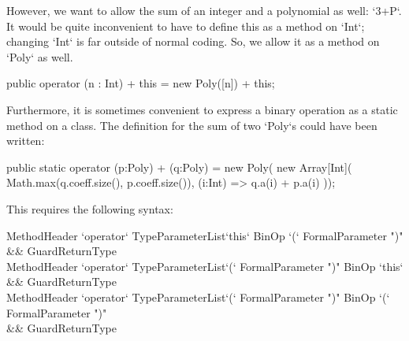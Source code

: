 However, we want to allow the sum of an integer and a polynomial as well:
\xcd`3+P`.  It would be quite inconvenient to have to define this as a method
on \xcd`Int`; changing \xcd`Int` is far outside of normal coding.  So, we
allow it as a method on \xcd`Poly` as well.


% 
\begin{xten}
   public operator (n : Int) + this = new Poly([n]) + this;
\end{xten}
% 
%     

Furthermore, it is sometimes convenient to express a binary operation as a
static method on a class. 
The definition for the sum of two
\xcd`Poly`s could have been written:
\begin{xten}
  public static operator (p:Poly) + (q:Poly) =  new Poly(
     new Array[Int](
        Math.max(q.coeff.size(), p.coeff.size()),
        (i:Int) => q.a(i) + p.a(i)
     ));
\end{xten}
%
% 
%     


This requires the following syntax:\\ 
\begin{grammar}
MethodHeader \:
  \xcd`operator` TypeParameterList\opt \xcd`this` BinOp \xcd`(`  FormalParameter \xcd")" \\
  && Guard\opt ReturnType\opt  \\
MethodHeader \:
  \xcd`operator` TypeParameterList\opt \xcd`(`  FormalParameter \xcd")" BinOp \xcd`this`  \\
  && Guard\opt ReturnType\opt   \\
MethodHeader \:
  \xcd`operator` TypeParameterList\opt \xcd`(`  FormalParameter \xcd")" BinOp  \xcd`(`  FormalParameter \xcd")"  \\
  && Guard\opt ReturnType\opt  \\
\end{grammar}

